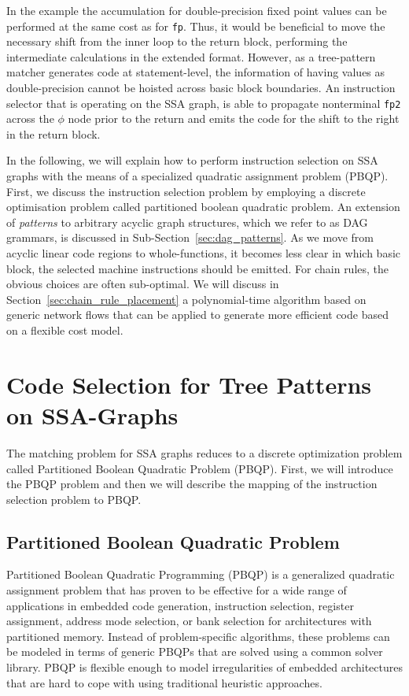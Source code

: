 In the example the accumulation for double-precision fixed
point values can be performed at the same cost as for \texttt{fp}. Thus, it would be
beneficial to move the necessary shift from the inner loop to the
return block, performing the intermediate calculations in the extended
format. However, as a tree-pattern matcher generates code at 
statement-level, the information of having values as double-precision
cannot be hoisted across basic block boundaries.
An instruction selector that is operating on the SSA graph, is able to propagate 
nonterminal \texttt{fp2} across the $\phi$ node prior to the return 
and emits the code for the shift to the right in the return block.

In the following, we will explain how to perform instruction selection
on SSA graphs with the means of a specialized quadratic assignment
problem (PBQP). First, we discuss the instruction selection problem by
employing a discrete optimisation problem called partitioned boolean
quadratic problem.  An extension of \emph{patterns} to arbitrary
acyclic graph structures, which we refer to as DAG grammars, is
discussed in Sub-Section~\ref{sec:dag_patterns}. As we move from
acyclic linear code regions to whole-functions, it becomes less
clear in which basic block, the selected machine instructions should
be emitted. For chain rules, the obvious choices are often
sub-optimal. We will discuss in Section~\ref{sec:chain_rule_placement}
a polynomial-time algorithm based on generic network flows that can be
applied to generate more efficient code based on a flexible cost
model.

\section{Code Selection for Tree Patterns on SSA-Graphs}
The matching problem for SSA graphs reduces to a discrete optimization
problem called Partitioned Boolean Quadratic Problem (PBQP).  First,
we will introduce the PBQP problem and then we will describe the
mapping of the instruction selection problem to PBQP.

\subsection{Partitioned Boolean Quadratic Problem}
\label{sec:pbqp}
Partitioned Boolean Quadratic Programming (PBQP) is a generalized
quadratic assignment problem that has proven to be effective for a
wide range of applications in embedded code generation, \eg
instruction selection, register assignment, address mode selection, or
bank selection for architectures with partitioned memory. Instead of
problem-specific algorithms, these problems can be modeled in terms of
generic {PBQP}s that are solved using a common solver library. PBQP is
flexible enough to model irregularities of embedded architectures that
are hard to cope with using traditional heuristic approaches.

